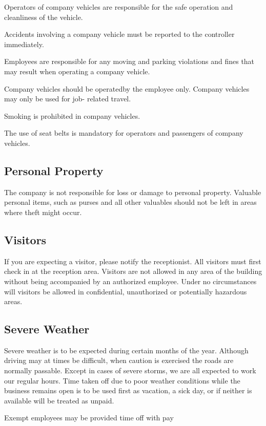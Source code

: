 Operators of company vehicles are responsible for the safe operation and cleanliness of the vehicle.

Accidents involving a company vehicle must be reported to the controller immediately.

Employees are responsible for any moving and parking violations and fines that may result when operating a company vehicle.

Company vehicles should be operatedby the employee only. Company vehicles may only be used for job- related travel.

Smoking is prohibited in company vehicles.

The use of seat belts is mandatory for operators and passengers of company vehicles.

\subsection{Personal Property}

The company is not responsible for loss or damage to personal property. Valuable personal items, such as purses and all other valuables should not be left in areas where theft might occur.

\subsection{Visitors}

If you are expecting a visitor, please notify the receptionist. All visitors must first check in at the reception area. Visitors are not allowed in any area of the building without being accompanied by an authorized employee. Under no circumstances will visitors be allowed in confidential, unauthorized or potentially hazardous areas.

\subsection{Severe Weather}

Severe weather is to be expected during certain months of the year. Although driving may at times be difficult, when caution is exercised the roads are normally passable. Except in cases of severe storms, we are all expected to work our regular hours. Time taken off due to poor weather conditions while the business remains open is to be used first as vacation, a sick day, or if neither is available will be treated as unpaid.

Exempt employees may be provided time off with pay

